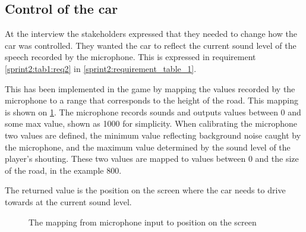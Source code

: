 \subsection{Control of the car}\label{sprint2:car_control}
At the interview the stakeholders expressed that they needed to change how the car was controlled.
They wanted the car to reflect the current sound level of the speech recorded by the microphone.
This is expressed in requirement \ref{sprint2:tab1:req2} in \cref{sprint2:requirement_table_1}.

This has been implemented in the game by mapping the values recorded by the microphone to a range that corresponds to the height of the road.
This mapping is shown on \cref{mapping}.
The microphone records sounds and outputs values between 0 and some max value, shown as 1000 for simplicity.
When calibrating the microphone two values are defined, the minimum value reflecting background noise caught by the microphone, and the maximum value determined by the sound level of the player's shouting.
These two values are mapped to values between 0 and the size of the road, in the example 800.

The returned value is the position on the screen where the car needs to drive towards at the current sound level.

\begin{figure}
\centering

\caption{The mapping from microphone input to position on the screen}
\label{mapping}
\end{figure}

